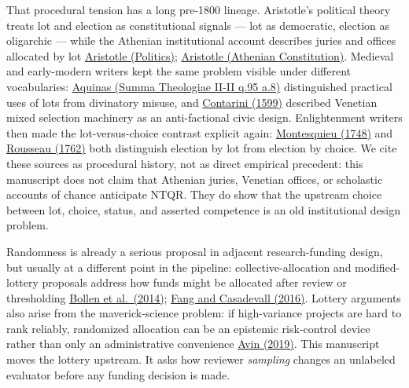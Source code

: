 \documentclass[
]{article}
\begin{document}
That procedural tension has a long pre-1800 lineage. Aristotle's
political theory treats lot and election as constitutional signals ---
lot as democratic, election as oligarchic --- while the Athenian
institutional account describes juries and offices allocated by lot
\href{https://topostext.org/work/100}{Aristotle (Politics)};
\href{https://topostext.org/work/99}{Aristotle (Athenian Constitution)}.
Medieval and early-modern writers kept the same problem visible under
different vocabularies:
\href{https://www.newadvent.org/summa/3095.htm\#article8}{Aquinas (Summa
Theologiae II-II q.95 a.8)} distinguished practical uses of lots from
divinatory misuse, and
\href{https://onlinebooks.library.upenn.edu/webbin/book/lookupid?key=olbp14764}{Contarini
(1599)} described Venetian mixed selection machinery as an
anti-factional civic design. Enlightenment writers then made the
lot-versus-choice contrast explicit again:
\href{https://oll.libertyfund.org/titles/montesquieu-complete-works-vol-1-the-spirit-of-laws}{Montesquieu
(1748)} and
\href{https://oll.libertyfund.org/titles/cole-the-social-contract-and-discourses}{Rousseau
(1762)} both distinguish election by lot from election by choice. We
cite these sources as procedural history, not as direct empirical
precedent: this manuscript does not claim that Athenian juries, Venetian
offices, or scholastic accounts of chance anticipate NTQR. They do show
that the upstream choice between lot, choice, status, and asserted
competence is an old institutional design problem.

Randomness is already a serious proposal in adjacent research-funding
design, but usually at a different point in the pipeline:
collective-allocation and modified-lottery proposals address how funds
might be allocated after review or thresholding
\href{https://doi.org/10.1002/embr.201338068}{Bollen et al.~(2014)};
\href{https://doi.org/10.1128/mBio.00422-16}{Fang and Casadevall
(2016)}. Lottery arguments also arise from the maverick-science problem:
if high-variance projects are hard to rank reliably, randomized
allocation can be an epistemic risk-control device rather than only an
administrative convenience
\href{https://doi.org/10.1016/j.shpsa.2018.11.006}{Avin (2019)}. This
manuscript moves the lottery upstream. It asks how reviewer
\emph{sampling} changes an unlabeled evaluator before any funding
decision is made.
\end{document}
